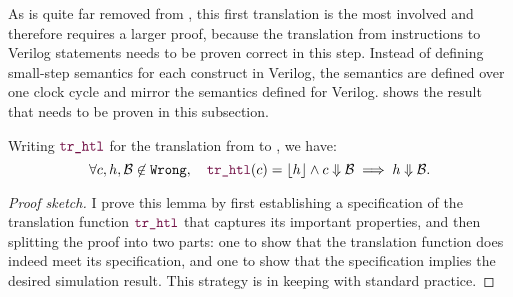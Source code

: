 As \htl{} is quite far removed from \rtlsubpar{}, this first translation is the
most involved and therefore requires a larger proof, because the translation
from \rtlsubpar{} instructions to Verilog statements needs to be proven correct
in this step. Instead of defining small-step semantics for each construct in
Verilog, the semantics are defined over one clock cycle and mirror the semantics
defined for Verilog.   shows the result that needs to be proven
in this subsection.

\begin{lemma}\label{lemma:htl}
  Writing {\normalfont $\yhfunction{tr\_htl}$} for the translation from \rtlsubpar{} to \htl{}, we
  have:
  {\normalfont\begin{equation}
    \forall c, h, \mathcal{B} \not\in \texttt{Wrong},\quad \yhfunction{tr\_htl} (c) = \ccok{h} \land c \Downarrow \mathcal{B} \implies h \Downarrow \mathcal{B}.
  \end{equation}}
\end{lemma}

\begin{proof}[Proof sketch]
  I prove this lemma by first establishing a specification of the translation
  function $\yhfunction{tr\_htl}$ that captures its important properties, and
  then splitting the proof into two parts: one to show that the translation
  function does indeed meet its specification, and one to show that the
  specification implies the desired simulation result. This strategy is in
  keeping with standard \compcert{} practice.

\end{proof}

